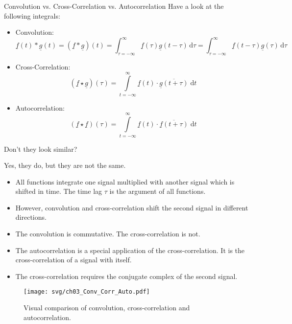\begin{refsection}
\begin{excursus}{Convolution vs. Cross-Correlation vs. Autocorrelation}
	Have a look at the following integrals:
	\begin{itemize}
		\item Convolution:
		\begin{equation*}
			\underline{f}(t) * \underline{g}(t) = \left(\underline{f} * \underline{g}\right) (t) = \int_{\tau = -\infty}^{\infty} \underline{f}(\tau) \underline{g}(t - \tau) \, \mathrm{d} \tau  = \int_{\tau = -\infty}^{\infty} \underline{f}(t - \tau) \underline{g}(\tau) \, \mathrm{d} \tau
		\end{equation*}
		\item Cross-Correlation:
		\begin{equation*}
			\left(\underline{f} \star \underline{g}\right)(\tau) = \int\limits_{t = -\infty}^{\infty} \underline{f}(t) \cdot \overline{\underline{g}(t+\tau)} \; \mathrm{d} t
		\end{equation*}
		\item Autocorrelation:
		\begin{equation*}
			\left(\underline{f} \star \underline{f}\right)(\tau) = \int\limits_{t = -\infty}^{\infty} \underline{f}(t) \cdot \overline{\underline{f}(t+\tau)} \; \mathrm{d} t
		\end{equation*}
	\end{itemize}
	Don't they look similar?
	
	Yes, they do, but they are not the same.
	\begin{itemize}
		\item All functions integrate one signal multiplied with another signal which is shifted in time. The time lag $\tau$ is the argument of all functions.
		\item However, convolution and cross-correlation shift the second signal in different directions.
		\item The convolution is commutative. The cross-correlation is not.
		\item The autocorrelation is a special application of the cross-correlation. It is the cross-correlation of a signal with itself.
		\item The cross-correlation requires the conjugate complex of the second signal.
	\end{itemize}

	\begin{figure}[H]
		\centering
		\texttt{[image: svg/ch03\_Conv\_Corr\_Auto.pdf]}
		\caption{Visual comparison of convolution, cross-correlation and autocorrelation. }
	\end{figure}
\end{excursus}


\end{refsection}
